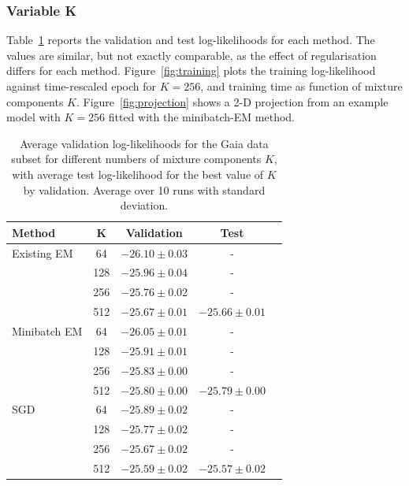 \subsubsection{Variable K}

Table~\ref{results-table} reports the validation and test log-likelihoods for each method.
The values are similar, but not exactly comparable, as the effect of regularisation differs for each method.
Figure~\ref{fig:training} plots the training log-likelihood against time-rescaled epoch for $K=256$, and training time as function of mixture components $K$.
Figure~\ref{fig:projection} shows a 2-D projection from an example model with $K=256$ fitted with the minibatch-EM method.

\begin{table}{}
  \caption{Average validation log-likelihoods for the Gaia data subset for different numbers of mixture components $K$, with average test log-likelihood for the best value of $K$ by validation. Average over 10 runs with standard deviation.}
  \label{results-table}
  \centering
  \begin{tabular}{lcccc}
      \toprule
      Method     & K &  Validation     & Test\\
      \midrule
      Existing EM & 64 & $-26.10 \pm 0.03$ & - \\
      \citet{bovyExtremeDeconvolutionInferring2011} & 128 & $-25.96 \pm 0.04$ & - \\
       & 256 & $-25.76 \pm 0.02$ & - \\
       & 512 & $-25.67 \pm 0.01$ & $-25.66 \pm 0.01$ \\
      \midrule
      Minibatch EM & 64 & $-26.05 \pm 0.01$ & - \\
       & 128 & $-25.91 \pm 0.01$ & - \\
       & 256 & $-25.83 \pm 0.00$ & - \\
       & 512 & $-25.80 \pm 0.00$ & $-25.79 \pm 0.00$ \\
      \midrule
      SGD & 64 & $-25.89 \pm 0.02$ & - \\
       & 128 & $-25.77 \pm 0.02$ & - \\
       & 256 & $-25.67 \pm 0.02$ & - \\
       & 512 & $-25.59 \pm 0.02$ & $-25.57 \pm 0.02$ \\
      \bottomrule
  \end{tabular}
\end{table}

